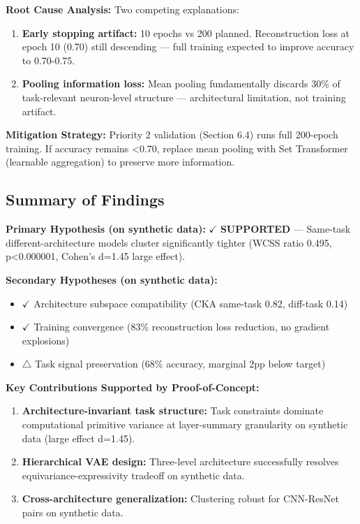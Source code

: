 \textbf{Root Cause Analysis:} Two competing explanations:

\begin{enumerate}
\item \textbf{Early stopping artifact:} 10 epochs vs 200 planned. Reconstruction loss at epoch 10 (0.70) still descending --- full training expected to improve accuracy to 0.70-0.75.

\item \textbf{Pooling information loss:} Mean pooling fundamentally discards 30\% of task-relevant neuron-level structure --- architectural limitation, not training artifact.
\end{enumerate}

\textbf{Mitigation Strategy:} Priority 2 validation (Section 6.4) runs full 200-epoch training. If accuracy remains <0.70, replace mean pooling with Set Transformer (learnable aggregation) to preserve more information.

\subsection{Summary of Findings}

\textbf{Primary Hypothesis (on synthetic data):} $\checkmark$ \textbf{SUPPORTED} --- Same-task different-architecture models cluster significantly tighter (WCSS ratio 0.495, p<0.000001, Cohen's d=1.45 large effect).

\textbf{Secondary Hypotheses (on synthetic data):}
\begin{itemize}
\item $\checkmark$ Architecture subspace compatibility (CKA same-task 0.82, diff-task 0.14)
\item $\checkmark$ Training convergence (83\% reconstruction loss reduction, no gradient explosions)
\item $\triangle$ Task signal preservation (68\% accuracy, marginal 2pp below target)
\end{itemize}

\textbf{Key Contributions Supported by Proof-of-Concept:}
\begin{enumerate}
\item \textbf{Architecture-invariant task structure:} Task constraints dominate computational primitive variance at layer-summary granularity on synthetic data (large effect d=1.45).
\item \textbf{Hierarchical VAE design:} Three-level architecture successfully resolves equivariance-expressivity tradeoff on synthetic data.
\item \textbf{Cross-architecture generalization:} Clustering robust for CNN-ResNet pairs on synthetic data.
\end{enumerate}

